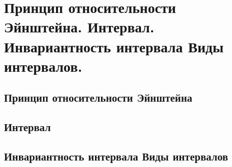 \chapter{Принцип относительности Эйнштейна. Интервал. Инвариантность 
интервала Виды интервалов.}

\section{Принцип относительности Эйнштейна}
\section{Интервал}
\section{Инвариантность интервала Виды интервалов}

